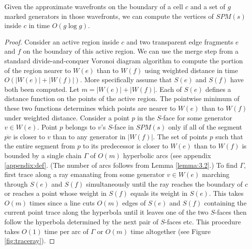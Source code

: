 \begin{Lemma} \label{lemma:4.12} 
	Given the approximate wavefronts on the boundary of a cell $c$ and a set of
	$g$ marked generators in those wavefronts, we can compute the vertices of
	$SPM(s)$ inside $c$ in time $O(g\log g)$.
\end{Lemma}
\begin{proof}
	Consider an active region inside $c$ and two transparent edge fragments $e$
	and $f$ on the boundary of this active region. We can use the merge step
	from a standard divide-and-conquer Voronoi diagram algorithm\cite{CompGeo} to compute the
	portion of the region nearer to $W(e)$ than to $W(f)$ using weighted
	distance in time $O(|W(e)|+|W(f)|)$. More specifically assume that $S(e)$
	and $S(f)$ have both been computed. Let $m=|W(e)|+|W(f)|$. Each of $S(e)$
	defines a distance function on the points of the active region. The
	pointwise minimum of these two functions determines which points are nearer
	to $W(e)$ than to $W(f)$ under weighted distance. Consider a point $p$ in
	the $S$-face for some generator $v\in W(e)$. Point $p$ belongs to $v$'s
	$S$-face in $SPM(s)$ only if all of the segment $\overline{pv}$ is closer to
	$v$ than to any generator in $|W(f)|$. The set of  points $p$ such that the
	entire segment from $p$ to its predecessor is closer to $W(e)$ than to
	$W(f)$ is bounded by a single chain $\Gamma$ of $O(m)$ hyperbolic arcs (see appendix \ref{appendix:def}. (The
	number of arcs follows from Lemma \ref{lemma:3.2}.) To find $\Gamma$, first trace along
	a ray emanating from some generator $v \in W(e)$ marching through $S(e)$ and
	$S(f)$ simultaneously until the ray reaches the boundary of $c$ or reaches a
	point whose weight in $S(f)$ equals its weight in $S(e)$. This takes $O(m)$
	times since a line cuts $O(m)$ edges of $S(e)$ and $S(f)$ containing the
	current point trace along the hyperbola until it leaves one of the two
	$S$-faces then follow the hyperbola determined by the next pair of $S$-faces
	etc. This procedure takes $O(1)$ time per arc of $\Gamma$ or $O(m)$ time
	altogether (see Figure \ref{fig:traceray}). 
    

\end{proof}
